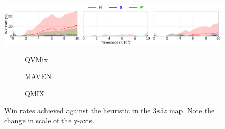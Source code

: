 \begin{subfigure}{\textwidth}
    
    \includegraphics[width=\textwidth]{tex_thesis/figures/ch7/3s5z_tiny_heuristic_plot_qvmixmavenqmix.pdf}
    \begin{subfigure}{.05\textwidth}
    \centering
    \caption*{}
    \end{subfigure}%
    \begin{subfigure}{.31\textwidth}
    \renewcommand\thesubfigure{\alph{subfigure}.1}
      \centering
      \caption{QVMix}
      \label{subfig:3s5z_vs_h_methodQVMIX}
    \end{subfigure}%
    \begin{subfigure}{.31\textwidth}
    \addtocounter{subfigure}{-1}
    \renewcommand\thesubfigure{\alph{subfigure}.2}
      \centering
      \caption{MAVEN}
      \label{subfig:3s5z_vs_h_methodMAVEN}
    \end{subfigure}%
    \begin{subfigure}{.31\textwidth}
    \addtocounter{subfigure}{-1}
    \renewcommand\thesubfigure{\alph{subfigure}.3}
      \centering
      \caption{QMIX}
      \label{subfig:3s5z_vs_h_methodQMIX}
    \end{subfigure}
\addtocounter{subfigure}{-1}
\caption{Win rates achieved against the heuristic in the $3s5z$ map. Note the change in scale of the y-axis.}
\label{subfig:3s5z_vsh}
\end{subfigure}
